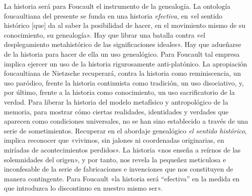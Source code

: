 La historia será para Foucault el instrumento de la genealogía. La ontología foucaultiana del presente se funda en una historia \emph{efectiva}, en «el sentido histórico {[}que{]} da al saber la posibilidad de hacer, en el movimiento mismo de su conocimiento, su genealogía». Hay que librar una batalla contra «el desplegamiento metahistórico de las significaciones ideales». Hay que adueñarse de la historia para hacer de ella un uso genealógico. Para Foucault tal empresa implica ejercer un uso de la historia rigurosamente anti-platónico. La apropiación foucaultiana de Nietzsche recuperará, contra la historia como reminiscencia, un uso paródico, frente la historia continuista como tradición, un uso disociativo, y, por último, frente a la historia como conocimiento, un uso sacrificatorio de la verdad. Para liberar la historia del modelo metafísico y antropológico de la memoria, para mostrar cómo ciertas realidades, identidades y verdades que aparecen como condiciones universales, no se han sino establecido a través de una serie de sometimientos. Recuperar en el abordaje genealógico \emph{el sentido histórico}, implica reconocer que «vivimos, sin jalones ni coordenadas originarias, en miríadas de acontecimientos perdidos». La historia «nos enseña a reírnos de las solemnidades del origen», y por tanto, nos revela la pequeñez meticulosa e inconfesable de la serie de fabricaciones e invenciones que nos constituyen de manera contingente. Para Foucault «la historia será ``efectiva'' en la medida en que introduzca lo discontinuo en nuestro mismo ser».

